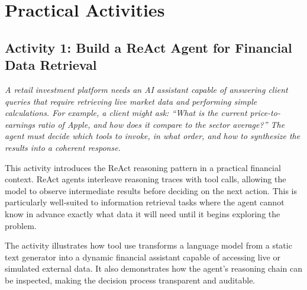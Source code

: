 \documentclass{article}
\begin{document}



\section{Practical Activities}

\subsection*{Activity 1: Build a ReAct Agent for Financial Data Retrieval}
\textit{
A retail investment platform needs an AI assistant capable of answering client queries that require retrieving live market data and performing simple calculations. For example, a client might ask: ``What is the current price-to-earnings ratio of Apple, and how does it compare to the sector average?'' The agent must decide which tools to invoke, in what order, and how to synthesize the results into a coherent response.
}

This activity introduces the ReAct reasoning pattern in a practical financial context. ReAct agents interleave reasoning traces with tool calls, allowing the model to observe intermediate results before deciding on the next action. This is particularly well-suited to information retrieval tasks where the agent cannot know in advance exactly what data it will need until it begins exploring the problem.

The activity illustrates how tool use transforms a language model from a static text generator into a dynamic financial assistant capable of accessing live or simulated external data. It also demonstrates how the agent's reasoning chain can be inspected, making the decision process transparent and auditable.
\end{document}
